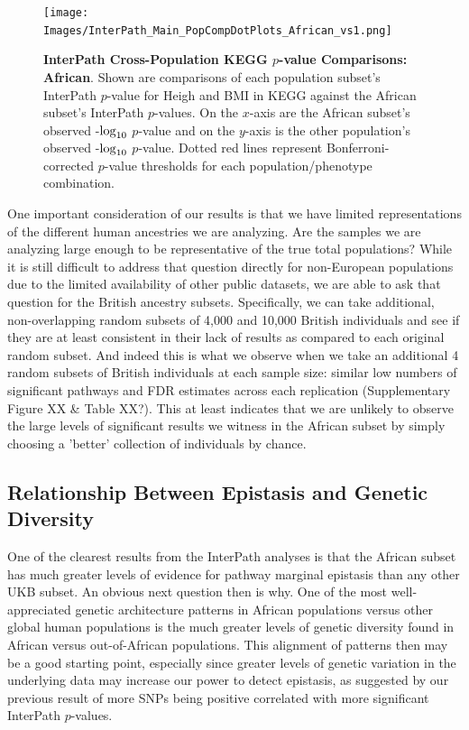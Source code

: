 \documentclass[12pt, a4paper]{article}
\def\log{{\rm log}}
\begin{document}
\begin{figure}[htbp]
\centering
\texttt{[image: Images/InterPath\_Main\_PopCompDotPlots\_African\_vs1.png]}
\caption[]{\textbf{InterPath Cross-Population KEGG $p$-value Comparisons: African}. Shown are comparisons of each population subset's InterPath $p$-value for Heigh and BMI in KEGG against the African subset's InterPath $p$-values. On the $x$-axis are the African subset's observed -$\log_{10}$ $p$-value and on the $y$-axis is the other population's observed -$\log_{10}$ $p$-value. Dotted red lines represent Bonferroni-corrected $p$-value thresholds for each population/phenotype combination.}
\label{InterPath-Main-Figure-PopCompDotPlots}
\end{figure}

One important consideration of our results is that we have limited representations of the different human ancestries we are analyzing. Are the samples we are analyzing large enough to be representative of the true total populations? While it is still difficult to address that question directly for non-European populations due to the limited availability of other public datasets, we are able to ask that question for the British ancestry subsets. Specifically, we can take additional, non-overlapping random subsets of 4,000 and 10,000 British individuals and see if they are at least consistent in their lack of results as compared to each original random subset. And indeed this is what we observe when we take an additional 4 random subsets of British individuals at each sample size: similar low numbers of significant pathways and FDR estimates across each replication (Supplementary Figure XX \& Table XX?). This at least indicates that we are unlikely to observe the large levels of significant results we witness in the African subset by simply choosing a 'better' collection of individuals by chance.  

\subsection{Relationship Between Epistasis and Genetic Diversity}

One of the clearest results from the InterPath analyses is that the African subset has much greater levels of evidence for pathway marginal epistasis than any other UKB subset. An obvious next question then is why. One of the most well-appreciated genetic architecture patterns in African populations versus other global human populations is the much greater levels of genetic diversity found in African versus out-of-African populations. This alignment of patterns then may be a good starting point, especially since greater levels of genetic variation in the underlying data may increase our power to detect epistasis, as suggested by our previous result of more SNPs being positive correlated with more significant InterPath $p$-values. 
\end{document}
